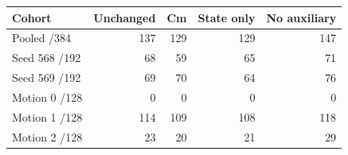 \begin{tabular}{lrrrr}
\toprule
Cohort & Unchanged & Cm & State only & No auxiliary\\
\midrule
Pooled /384 & 137 & 129 & 129 & 147\\
Seed 568 /192 & 68 & 59 & 65 & 71\\
Seed 569 /192 & 69 & 70 & 64 & 76\\
Motion 0 /128 & 0 & 0 & 0 & 0\\
Motion 1 /128 & 114 & 109 & 108 & 118\\
Motion 2 /128 & 23 & 20 & 21 & 29\\
\bottomrule
\end{tabular}
